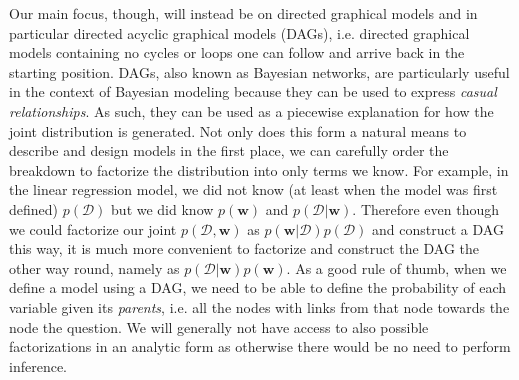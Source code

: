 Our main focus, though, will instead be on directed graphical models and in particular directed acyclic 
graphical models (DAGs), i.e. directed graphical models containing no cycles or loops one can follow 
and arrive back in the starting position.  DAGs, also known as Bayesian networks, are particularly
useful in the context of Bayesian modeling because they can be used to express \emph{casual relationships}.
As such, they can be used as a piecewise explanation for how the joint distribution is generated.
Not only does this form a natural means to describe and design models in the first place, 
we can carefully order the breakdown to factorize the distribution into only terms we know.  For example,
in the linear regression model, we did not know (at least when the model was first defined) 
$p(\mathcal{D})$ but we did know $p(\mathbf{w})$ and $p(\mathcal{D} | \mathbf{w})$.  Therefore even
though we could factorize our joint $p(\mathcal{D}, \mathbf{w})$ as 
$p(\mathbf{w} | \mathcal{D})p(\mathcal{D})$ and construct a DAG this way, it is much more convenient
to factorize and construct the DAG the other way round, namely as 
$p(\mathcal{D} | \mathbf{w})p(\mathbf{w})$.
As a good rule of thumb, when we define a model using a DAG, we need to be able to define the 
probability of each variable given its \emph{parents}, i.e. all the nodes with links from that node
towards the node the question.  We will generally not have access to also possible factorizations
in an analytic form as otherwise there would be no need to perform inference.


